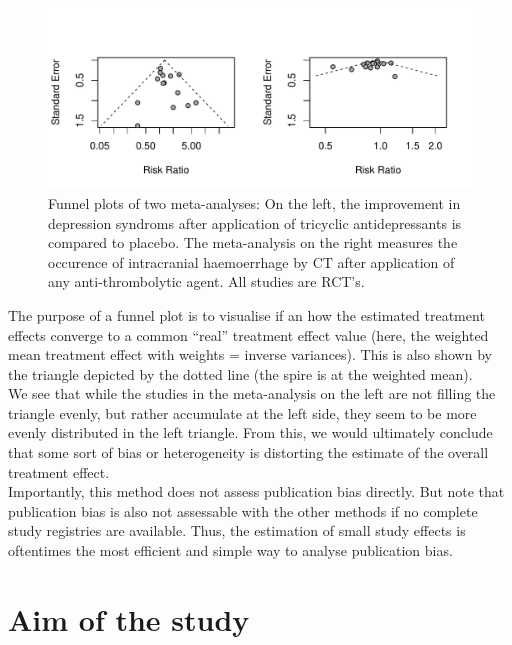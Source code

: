 \documentclass[11pt,a4paper,twoside]{book}\usepackage[]{graphicx}\usepackage[]{color}
\makeatletter
\def\maxwidth{ %
  \ifdim\Gin@nat@width>\linewidth
    \linewidth
  \else
    \Gin@nat@width
  \fi
}
\newenvironment{knitrout}{}{} %
\makeatother
\begin{document}
\begin{figure}
\begin{knitrout}
\color{fgcolor}
\includegraphics[width=\maxwidth]{figure/unnamed-chunk-1-1} 

\end{knitrout}
\caption{Funnel plots of two meta-analyses: On the left, the improvement in depression syndroms after application of tricyclic antidepressants is compared to placebo. The meta-analysis on the right measures the occurence of intracranial haemoerrhage by CT after application of any anti-thrombolytic agent. All studies are RCT's.}
\label{small.study.effect.examples}
\end{figure}

The purpose of a funnel plot is to visualise if an how the estimated treatment effects converge to a common ``real'' treatment effect value (here, the weighted mean treatment effect with weights = inverse variances). This is also shown by the triangle depicted by the dotted line (the spire is at the weighted mean). \\
We see that while the studies in the meta-analysis on the left are not filling the triangle evenly, but rather accumulate at the left side, they seem to be more evenly distributed in the left triangle. From this, we would ultimately conclude that some sort of bias or heterogeneity is distorting the estimate of the overall treatment effect.\\
Importantly, this method does not assess publication bias directly. But note that publication bias is also not assessable with the other methods if no complete study registries are available. Thus, the estimation of small study effects is oftentimes the most efficient and simple way to analyse publication bias.

\section{Aim of the study}
\end{document}
